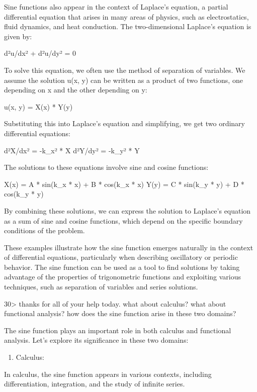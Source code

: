 \documentclass[
]{article}
\providecommand{\tightlist}{%
  \setlength{\itemsep}{0pt}\setlength{\parskip}{0pt}}
\begin{document}
Sine functions also appear in the context of Laplace's equation, a
partial differential equation that arises in many areas of physics, such
as electrostatics, fluid dynamics, and heat conduction. The
two-dimensional Laplace's equation is given by:

d²u/dx² + d²u/dy² = 0

To solve this equation, we often use the method of separation of
variables. We assume the solution u(x, y) can be written as a product of
two functions, one depending on x and the other depending on y:

u(x, y) = X(x) * Y(y)

Substituting this into Laplace's equation and simplifying, we get two
ordinary differential equations:

d²X/dx² = -k\_x² * X d²Y/dy² = -k\_y² * Y

The solutions to these equations involve sine and cosine functions:

X(x) = A * sin(k\_x * x) + B * cos(k\_x * x) Y(y) = C * sin(k\_y * y) +
D * cos(k\_y * y)

By combining these solutions, we can express the solution to Laplace's
equation as a sum of sine and cosine functions, which depend on the
specific boundary conditions of the problem.

These examples illustrate how the sine function emerges naturally in the
context of differential equations, particularly when describing
oscillatory or periodic behavior. The sine function can be used as a
tool to find solutions by taking advantage of the properties of
trigonometric functions and exploiting various techniques, such as
separation of variables and series solutions.

30\textgreater{} thanks for all of your help today. what about calculus?
what about functional analysis? how does the sine function arise in
these two domains?

The sine function plays an important role in both calculus and
functional analysis. Let's explore its significance in these two
domains:

\begin{enumerate}
\def\labelenumi{\arabic{enumi}.}
\tightlist
\item
  Calculus:
\end{enumerate}

In calculus, the sine function appears in various contexts, including
differentiation, integration, and the study of infinite series.
\end{document}
